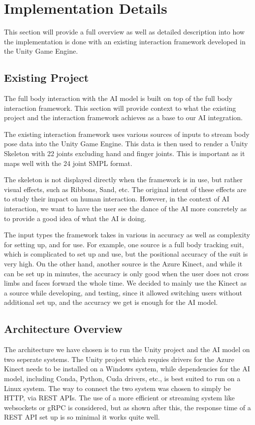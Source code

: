 \documentclass[final,5p,times,authoryear]{article}
\begin{document}
\section{Implementation Details}
This section will provide a full overview as well as detailed description into how the implementation is done with an existing interaction framework developed in the Unity Game Engine.

\subsection{Existing Project}
The full body interaction with the AI model is built on top of the full body interaction framework. This section will provide context to what the existing project and the interaction framework achieves as a base to our AI integration.

The existing interaction framework uses various sources of inputs to stream body pose data into the Unity Game Engine. This data is then used to render a Unity Skeleton with 22 joints excluding hand and finger joints. This is important as it maps well with the 24 joint SMPL format.

The skeleton is not displayed directly when the framework is in use, but rather visual effects, such as Ribbons, Sand, etc. The original intent of these effects are to study their impact on human interaction. However, in the context of AI interaction, we want to have the user see the dance of the AI more concretely as to provide a good idea of what the AI is doing.

The input types the framework takes in various in accuracy as well as complexity for setting up, and for use. For example, one source is a full body tracking suit, which is complicated to set up and use, but the positional accuracy of the suit is very high. On the other hand, another source is the Azure Kinect, and while it can be set up in minutes, the accuracy is only good when the user does not cross limbs and faces forward the whole time. We decided to mainly use the Kinect as a source while developing, and testing, since it allowed switching users without additional set up, and the accuracy we get is enough for the AI model.

\subsection{Architecture Overview}
The architecture we have chosen is to run the Unity project and the AI model on two seperate systems. The Unity project which requies drivers for the Azure Kinect needs to be installed on a Windows system, while dependencies for the AI model, including Conda, Python, Cuda drivers, etc., is best suited to run on a Linux system. The way to connect the two system was chosen to simply be HTTP, via REST APIs. The use of a more efficient or streaming system like websockets or gRPC is considered, but as shown after this, the response time of a REST API set up is so minimal it works quite well.
\end{document}
